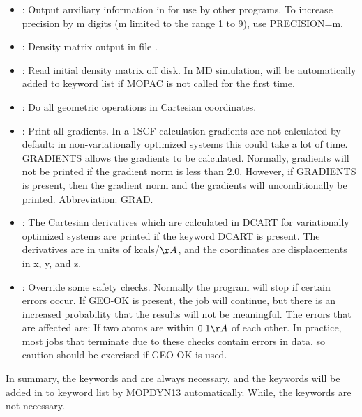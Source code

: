 \documentclass[11pt]{JHEP3}
\begin{document}
\begin{itemize}
\item {}: Output auxiliary information in 
for use by other programs. To increase precision by m digits (m
limited to the range 1 to 9), use PRECISION=m.

\item {}: Density matrix output in file
.

\item {}: Read initial density matrix off disk. In MD
simulation,  will be automatically added to keyword
list if MOPAC is not called for the first time.

\item {}: Do all geometric operations in Cartesian
coordinates.

\item {}: Print all gradients. In a 1SCF calculation gradients
are not calculated by default: in non-variationally optimized
systems this could take a lot of time. GRADIENTS allows the
gradients to be calculated. Normally, gradients will not be printed
if the gradient norm is less than $2.0$. However, if GRADIENTS is
present, then the gradient norm and the gradients will
unconditionally be printed. Abbreviation: GRAD.

\item {}: The Cartesian derivatives which are calculated
in DCART for variationally optimized systems are printed if the
keyword DCART is present. The derivatives are in units of
kcals/$\AA$, and the coordinates are displacements in x, y, and z.

\item {}: Override some safety checks. Normally the
program will stop if certain errors occur. If GEO-OK is present, the
job will continue, but there is an increased probability that the
results will not be meaningful. The errors that are affected are: If
two atoms are within $0.1\AA$ of each other. In practice, most jobs
that terminate due to these checks contain errors in data, so
caution should be exercised if GEO-OK is used.

\end{itemize}

In summary, the keywords  and
 are always necessary, and the keywords
 will be added in
to keyword list by MOPDYN13 automatically. While, the keywords
 are not necessary.
\end{document}

